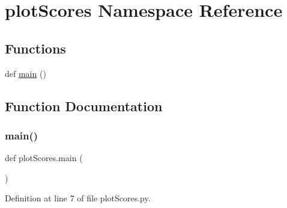 \hypertarget{namespaceplot_scores}{}\section{plot\+Scores Namespace Reference}
\label{namespaceplot_scores}
\subsection*{Functions}
\begin{DoxyCompactItemize}
\item 
def \hyperlink{namespaceplot_scores_a551dc9ac3995d0c5fdec24d0f424de61}{main} ()
\end{DoxyCompactItemize}


\subsection{Function Documentation}
\mbox{\label{namespaceplot_scores_a551dc9ac3995d0c5fdec24d0f424de61}} 
\subsubsection{\texorpdfstring{main()}{main()}}
{\footnotesize\ttfamily def plot\+Scores.\+main (\begin{DoxyParamCaption}{ }\end{DoxyParamCaption})}



Definition at line 7 of file plot\+Scores.\+py.

